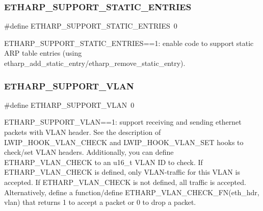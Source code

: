 \subsubsection{\texorpdfstring{E\+T\+H\+A\+R\+P\+\_\+\+S\+U\+P\+P\+O\+R\+T\+\_\+\+S\+T\+A\+T\+I\+C\+\_\+\+E\+N\+T\+R\+I\+ES}{ETHARP\_SUPPORT\_STATIC\_ENTRIES}\hspace{0.1cm}{\footnotesize\ttfamily [2/2]}}
{\footnotesize\ttfamily \#define E\+T\+H\+A\+R\+P\+\_\+\+S\+U\+P\+P\+O\+R\+T\+\_\+\+S\+T\+A\+T\+I\+C\+\_\+\+E\+N\+T\+R\+I\+ES~0}

E\+T\+H\+A\+R\+P\+\_\+\+S\+U\+P\+P\+O\+R\+T\+\_\+\+S\+T\+A\+T\+I\+C\+\_\+\+E\+N\+T\+R\+I\+ES==1\+: enable code to support static A\+RP table entries (using etharp\+\_\+add\+\_\+static\+\_\+entry/etharp\+\_\+remove\+\_\+static\+\_\+entry). \mbox{\label{group__lwip__opts__arp_ga70ce0ecf56cf5fab000134e66d863f90}} 
\subsubsection{\texorpdfstring{E\+T\+H\+A\+R\+P\+\_\+\+S\+U\+P\+P\+O\+R\+T\+\_\+\+V\+L\+AN}{ETHARP\_SUPPORT\_VLAN}\hspace{0.1cm}{\footnotesize\ttfamily [1/2]}}
{\footnotesize\ttfamily \#define E\+T\+H\+A\+R\+P\+\_\+\+S\+U\+P\+P\+O\+R\+T\+\_\+\+V\+L\+AN~0}

E\+T\+H\+A\+R\+P\+\_\+\+S\+U\+P\+P\+O\+R\+T\+\_\+\+V\+L\+AN==1\+: support receiving and sending ethernet packets with V\+L\+AN header. See the description of L\+W\+I\+P\+\_\+\+H\+O\+O\+K\+\_\+\+V\+L\+A\+N\+\_\+\+C\+H\+E\+CK and L\+W\+I\+P\+\_\+\+H\+O\+O\+K\+\_\+\+V\+L\+A\+N\+\_\+\+S\+ET hooks to check/set V\+L\+AN headers. Additionally, you can define E\+T\+H\+A\+R\+P\+\_\+\+V\+L\+A\+N\+\_\+\+C\+H\+E\+CK to an u16\+\_\+t V\+L\+AN ID to check. If E\+T\+H\+A\+R\+P\+\_\+\+V\+L\+A\+N\+\_\+\+C\+H\+E\+CK is defined, only V\+L\+A\+N-\/traffic for this V\+L\+AN is accepted. If E\+T\+H\+A\+R\+P\+\_\+\+V\+L\+A\+N\+\_\+\+C\+H\+E\+CK is not defined, all traffic is accepted. Alternatively, define a function/define E\+T\+H\+A\+R\+P\+\_\+\+V\+L\+A\+N\+\_\+\+C\+H\+E\+C\+K\+\_\+\+F\+N(eth\+\_\+hdr, vlan) that returns 1 to accept a packet or 0 to drop a packet. \mbox{\label{group__lwip__opts__arp_ga70ce0ecf56cf5fab000134e66d863f90}} 
